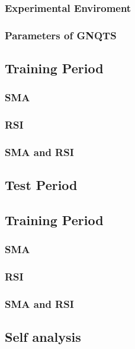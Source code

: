 \documentclass[../main.tex]{subfiles}
\begin{document}
\subsubsection{Experimental Enviroment}

\subsubsection{Parameters of GNQTS}

\subsection{Training Period}

\subsubsection{SMA}
\subsubsection{RSI}
\subsubsection{SMA and RSI}

\subsection{Test Period}
\subsection{Training Period}
\subsubsection{SMA}
\subsubsection{RSI}
\subsubsection{SMA and RSI}

\subsection{Self analysis}
\end{document}
